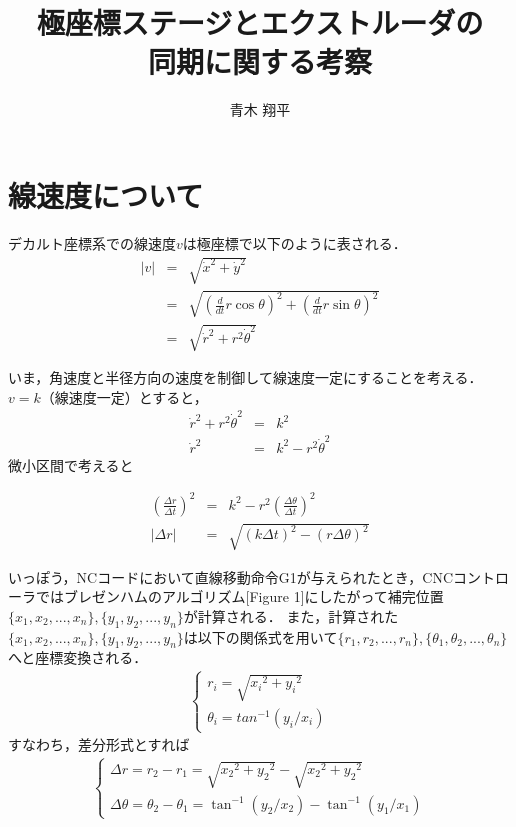 \documentclass[twocolumn,oneside,a4paper]{article}
\title{極座標ステージとエクストルーダの\\同期に関する考察}
\author{青木 翔平}
\begin{document}
\maketitle

\section{線速度について}
デカルト座標系での線速度$v$は極座標で以下のように表される．
\begin{eqnarray}
|v| &=& \sqrt{\dot{x}^2 + \dot{y}^2} \nonumber \\
  &=& \sqrt{ \left(\frac{d}{dt} r \cos\theta \right) ^2 + \left(\frac{d}{dt}r \sin\theta\right) ^2} \nonumber \\
  &=& \sqrt{ \dot{r}^2+ r^2 \dot{\theta}^2 } 
\end{eqnarray}	
	
いま，角速度と半径方向の速度を制御して線速度一定にすることを考える．
$v=k$（線速度一定）とすると，
\begin{eqnarray*}
  \dot{r}^2+ r^2 \dot{\theta}^2 &=& k^2 \\
  \dot{r}^2 &=&  k^2 - r^2 \dot{\theta}^2 
\end{eqnarray*}
微小区間で考えると

\begin{eqnarray}\label{eq:deltar}
	\left( \frac{\Delta r}{\Delta t}\right)^2 &=&  k^2 - r^2 \left( \frac{\Delta \theta}{\Delta t}\right)^2 \nonumber \\
|\Delta r| &=& \sqrt{(k \Delta t)^2 - (r \Delta \theta)^2}
\end{eqnarray}

いっぽう，NCコードにおいて直線移動命令G1が与えられたとき，CNCコントローラではブレゼンハムのアルゴリズム[Figure 1]にしたがって補完位置$\{x_1,x_2,...,x_n\},\{y_1,y_2,...,y_n\}$が計算される．
また，計算された$\{x_1,x_2,...,x_n\},\{y_1,y_2,...,y_n\}$は以下の関係式を用いて$\{r_1,r_2,...,r_n\},\{\theta_1,\theta_2,...,\theta_n\}$へと座標変換される．　
\begin{eqnarray*}
\left\{
  \begin{array}{ll}
r_i = \sqrt{{x_i}^2+{y_i}^2} \\	
\theta_i = tan^{-1} (y_i / x_i)
  \end{array}
  \right.
\end{eqnarray*}
すなわち，差分形式とすれば
\begin{eqnarray}\label{eq:diff}
\left\{
  \begin{array}{ll}
\Delta r = r_2-r_1 = \sqrt{{x_2}^2+{y_2}^2} - \sqrt{{x_2}^2+{y_2}^2} \\	
\Delta \theta = \theta_2-\theta_1 = \tan^{-1} (y_2 / x_2) - \tan^{-1} (y_1 / x_1)
  \end{array}
  \right. 
\end{eqnarray}
\end{document}
